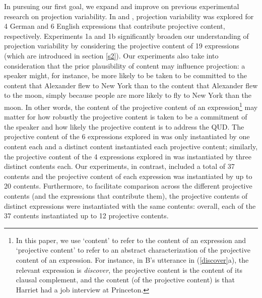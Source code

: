 \documentclass[11pt,fleqn]{article}
\newcommand{\6}{\mbox{$[\hspace*{-.6mm}[$}}
\newcommand{\9}{\mbox{$]\hspace*{-.6mm}]$}}
\begin{document}
In pursuing our first goal, we expand and improve on previous experimental research on projection variability. In \citealt{xue-onea11} and \citealt{smith-hall11}, projection variability was explored for 4 German and 6 English expressions that contribute projective content, respectively. Experiments 1a and 1b significantly broaden our understanding of projection variability by considering the projective content of 19 expressions (which are introduced in section \ref{s2}). Our experiments also take into consideration that the prior plausibility of content may influence projection: a speaker might, for instance, be more likely to be taken to be committed to the content that Alexander flew to New York than to the content that Alexander flew to the moon, simply because people are more likely to fly to New York than the moon. In other words, the content of the projective content of an expression\footnote{\label{f-content}In this paper, we use `content' to refer to the content of an expression and `projective content' to refer to an abstract characterization of the projective content of an expression. For instance, in B's utterance in (\ref{discover}a), the relevant expression is {\em discover}, the projective content is the content of its clausal complement, and the content (of the projective content) is that Harriet had a job interview at Princeton.} may matter for how robustly the projective content is taken to be a commitment of the speaker and how likely the projective content is to address the QUD. The projective content of the 6 expressions explored in \citealt{smith-hall11} was only instantiated by one content each and a distinct content instantiated each projective content; similarly, the projective content of the 4 expressions explored in \citealt{xue-onea11} was instantiated by three distinct contents each. Our experiments, in contrast, included a total of 37 contents and the projective content of each expression was instantiated by up to 20 contents. Furthermore, to facilitate comparison across the different projective contents (and the expressions that contribute them), the projective contents of distinct expressions were instantiated with the same contents: overall, each of the 37 contents instantiated up to 12 projective contents.
\end{document}
